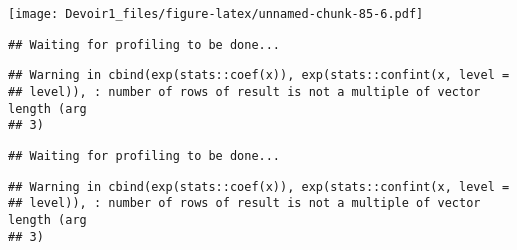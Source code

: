 \documentclass[]{article}
\newenvironment{Shaded}{\begin{snugshade}}{\end{snugshade}}
\newcommand{\KeywordTok}[1]{\textcolor[rgb]{0.13,0.29,0.53}{\textbf{#1}}}
\newcommand{\DataTypeTok}[1]{\textcolor[rgb]{0.13,0.29,0.53}{#1}}
\newcommand{\DecValTok}[1]{\textcolor[rgb]{0.00,0.00,0.81}{#1}}
\newcommand{\StringTok}[1]{\textcolor[rgb]{0.31,0.60,0.02}{#1}}
\newcommand{\OperatorTok}[1]{\textcolor[rgb]{0.81,0.36,0.00}{\textbf{#1}}}
\newcommand{\NormalTok}[1]{#1}
\begin{document}
\texttt{[image: Devoir1\_files/figure-latex/unnamed-chunk-85-6.pdf]}

\begin{Shaded}
\end{Shaded}

\begin{verbatim}
## Waiting for profiling to be done...
\end{verbatim}

\begin{verbatim}
## Warning in cbind(exp(stats::coef(x)), exp(stats::confint(x, level =
## level)), : number of rows of result is not a multiple of vector length (arg
## 3)
\end{verbatim}

\begin{verbatim}
## Waiting for profiling to be done...
\end{verbatim}

\begin{verbatim}
## Warning in cbind(exp(stats::coef(x)), exp(stats::confint(x, level =
## level)), : number of rows of result is not a multiple of vector length (arg
## 3)
\end{verbatim}
\end{document}
